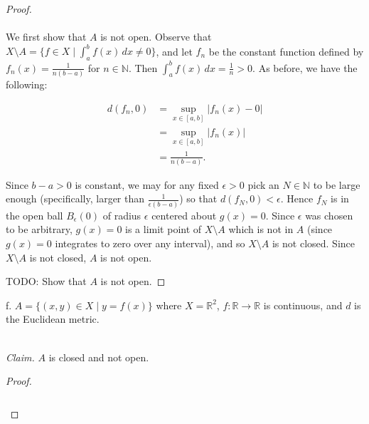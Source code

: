 \begin{proof}\renewcommand{\qedsymbol}{}\ \\\\
    We first show that $A$ is not open. Observe that $X \setminus A = \{f \in X \mid \int_a^b{f(x) \,dx} \neq 0 \}$, and
    let $f_n$ be the constant function defined by $f_n(x) = \frac{1}{n(b - a)}$ for $n \in \mathbb{N}$. Then 
    $\int_a^b{f(x) \,dx} = \frac{1}{n} > 0$. As before, we have the following:


    \begin{align*}
         d(f_n, 0) &= \sup\limits_{x \in [a, b]}{|f_n(x) - 0|} \\ 
                   &= \sup\limits_{x \in [a, b]}{|f_n(x)|} \\ 
                   &= \frac{1}{n(b - a)}.
    \end{align*}

    Since $b - a > 0$ is constant, we may for any fixed $\epsilon > 0$ pick an $N \in \mathbb{N}$ to be large enough 
    (specifically, larger than $\frac{1}{\epsilon(b - a)}$) so that $d(f_N, 0) < \epsilon$. Hence $f_N$ is in
    the open ball $B_\epsilon(0)$ of radius $\epsilon$ centered about $g(x) = 0$. Since $\epsilon$ was chosen to be
    arbitrary, $g(x) = 0$ is a limit point of $X \setminus A$ which is not in $A$ (since $g(x) = 0$ integrates to zero 
    over any interval), and so $X \setminus A$ is not closed. Since $X \setminus A$ is not closed, $A$ is not open.

    TODO: Show that $A$ is not open.
\end{proof}

\pagebreak

f.  $A = \{ (x, y) \in X \mid y = f(x) \}$ where $X = \mathbb{R}^2$, $f:\mathbb{R} \to \mathbb{R}$ is continuous, and 
    $d$ is the Euclidean metric.

\ \\
\emph{Claim.} $A$ is closed and not open.

\begin{proof}\renewcommand{\qedsymbol}{}\ \\\\
    \begin{align*}
    \end{align*}
\end{proof}

\pagebreak